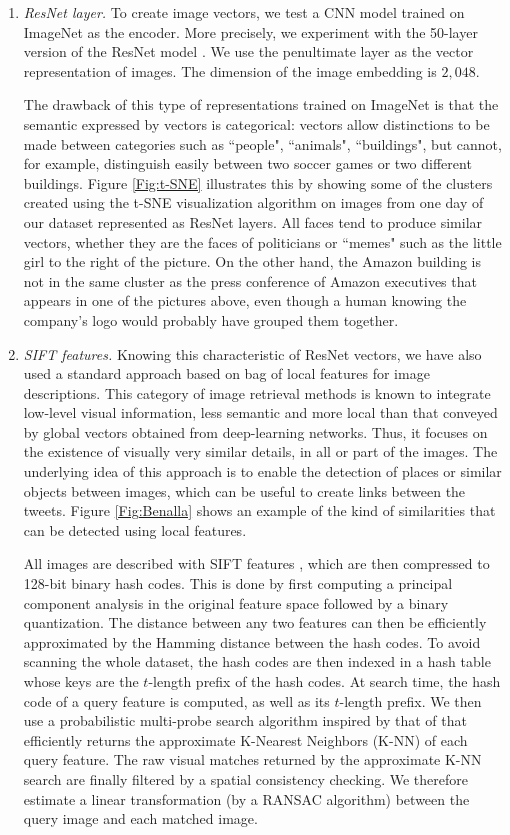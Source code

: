 \begin{enumerate}
    \item{\textit{ResNet layer.}} To create image vectors, we test a CNN model trained on ImageNet as the encoder. More precisely, we experiment with the 50-layer version of the ResNet model \citep{he2016deep}. We use the penultimate layer as the vector representation of images. The dimension of the image embedding is $2,048$.
    
    The drawback of this type of representations trained on ImageNet is that the semantic expressed by vectors is categorical: vectors allow distinctions to be made between categories such as ``people", ``animals", ``buildings", but cannot, for example, distinguish easily between two soccer games or two different buildings. Figure \ref{Fig:t-SNE} illustrates this by showing some of the clusters created using the t-SNE visualization algorithm  \citep{maaten2008visualizing} on images from one day of our dataset represented as ResNet layers. All faces tend to produce similar vectors, whether they are the faces of politicians or ``memes" such as the little girl to the right of the picture. On the other hand, the Amazon building is not in the same cluster as the press conference of Amazon executives that appears in one of the pictures above, even though a human knowing the company's logo would probably have grouped them together.
    
    \item{\textit{SIFT features.}} Knowing this characteristic of ResNet vectors, we have also used a standard approach based on bag of local features for image descriptions. This category of image retrieval methods is known to integrate low-level visual information, less semantic and more local than that conveyed by global vectors obtained from deep-learning networks. Thus, it focuses on the existence of visually very similar details, in all or part of the images. The underlying idea of this approach is to enable the detection of places or similar objects between images, which can be useful to create links between the tweets. Figure \ref{Fig:Benalla} shows an example of the kind of similarities that can be detected using local features.
    
    All images are described with SIFT features \cite{lowe1999object}, which are then compressed to 128-bit binary hash codes. This is done by first computing a principal component analysis in the original feature space followed by a binary quantization. The distance between any two features can then be efficiently approximated by the Hamming distance between the hash codes. To avoid scanning the whole dataset, the hash codes are then indexed in a hash table whose keys are the $t$-length prefix of the hash codes. At search time, the hash code  of a query feature is computed, as well as its $t$-length prefix. We then use a probabilistic multi-probe search algorithm inspired by that of \cite{joly2008posteriori} that efficiently returns the approximate K-Nearest Neighbors (K-NN) of each query feature. The raw visual matches returned by the approximate K-NN search are finally filtered by a spatial consistency checking. We therefore estimate a linear transformation (by a RANSAC algorithm) between the query image and each matched image.
    

\end{enumerate}
